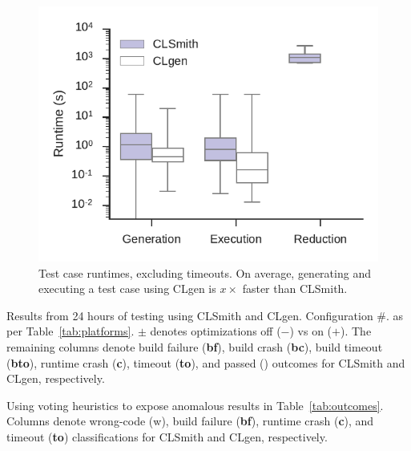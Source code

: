 \begin{figure}
	\centering %
	\includegraphics[width=\columnwidth]{build/img/runtimes}%
	\caption{%
		Test case runtimes, excluding timeouts. On average, generating and executing a test case using CLgen is $x\times$ faster than CLSmith. %
	}%
	\label{fig:runtimes} %
\end{figure}


\begin{table}
	\scriptsize %
	\centering %
	
	\caption{Results from 24 hours of testing using CLSmith and CLgen. Configuration \#. as per Table~\ref{tab:platforms}. $\pm$ denotes optimizations off ($-$) vs on ($+$). The remaining columns denote build failure (\textbf{bf}), build crash (\textbf{bc}), build timeout (\textbf{bto}), runtime crash (\textbf{c}), timeout (\textbf{to}), and passed (\textbf{\cmark}) outcomes for CLSmith and CLgen, respectively. }
	\label{tab:outcomes}
\end{table}

\begin{table}
	\scriptsize %
	\centering %
	
	\caption{Using voting heuristics to expose anomalous results in Table~\ref{tab:outcomes}. Columns denote wrong-code (w), build failure (\textbf{bf}), runtime crash (\textbf{c}), and timeout (\textbf{to}) classifications for CLSmith and CLgen, respectively. }
	\label{tab:classifications}
\end{table}

